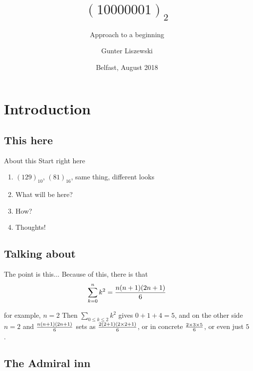 \documentclass[pdf]{beamer}
\title{$(10000001)_2$}
\subtitle{Approach to a beginning}
\author[Gunter Liszewski\\ \copyright 2018]{Gunter Liszewski}
\date{Belfast, August 2018}
\begin{document}
\begin{frame}
  \titlepage
\end{frame}


\section{Introduction}
\subsection{This here}

\begin{frame}{About this}
  Start right here
  \begin{enumerate}[A]
    \pause
    \item{} $(129)_{10}$, $(81)_{16}$, same thing, different looks
    \pause
    \item{} What will be here?
    \pause
    \item{} How?
    \pause
    \item{} Thoughts!
  \end{enumerate}
\end{frame}
\subsection{Talking about}

\begin{frame}{The point is this...}
  Because of this, there is that
$$\sum_{k=0}^{n}{k^2}={n(n+1)(2n+1)\over 6}$$
\end{frame}


\begin{frame}{for example, $n=2$}
  Then $\sum_{0\le k\le2}k^2$ gives $0+1+4=5$, and on the other side $n=2$ and ${n(n+1)(2n+1)\over 6}$
sets as ${2(2+1)(2\times2+1)\over 6}$, or in concrete $2\times3\times5\over6$, or even just $5$.
\end{frame}

\subsection{The Admiral inn}
\end{document}
